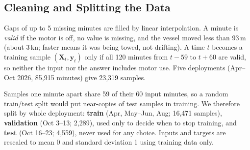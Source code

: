 \documentclass[sigconf]{acmart}
\begin{document}

\subsection{Cleaning and Splitting the Data}\label{sec:data}
Gaps of up to 5 missing minutes are filled by linear interpolation. A minute is \emph{valid} if the motor is off, no value is missing, and the vessel moved less than 93\,m (about 3\,kn; faster means it was being towed, not drifting). A time $t$ becomes a training sample $(\mathbf{X}_t,\mathbf{y}_t)$ only if all 120 minutes from $t-59$ to $t+60$ are valid, so neither the input nor the answer includes motor use. Five deployments (Apr--Oct 2026, 85{,}915 minutes) give 23{,}319 samples.

Samples one minute apart share 59 of their 60 input minutes, so a random train/test split would put near-copies of test samples in training. We therefore split by whole deployment: \textbf{train} (Apr, May--Jun, Aug; 16{,}471 samples), \textbf{validation} (Oct 3--13; 2{,}289), used only to decide when to stop training, and \textbf{test} (Oct 16--23; 4{,}559), never used for any choice. Inputs and targets are rescaled to mean 0 and standard deviation 1 using training data only.
\end{document}
